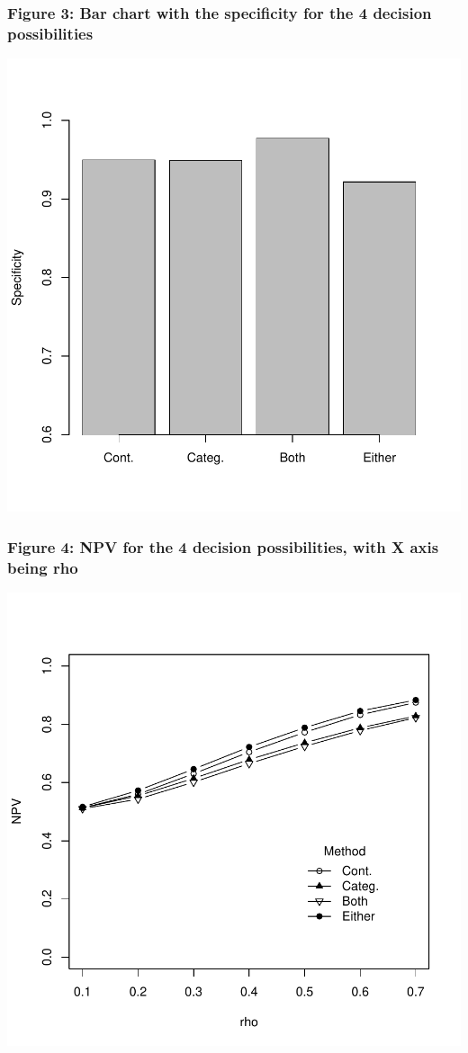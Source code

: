 \documentclass{article}
\begin{document}
\subsubsection*{Figure 3: Bar chart with the specificity for the 4 decision possibilities }



\includegraphics{accuracy_category-ff}

\subsubsection*{Figure 4: NPV for the 4 decision possibilities, with X axis being rho}


\includegraphics{accuracy_category-gg}
\end{document}
